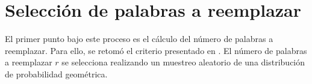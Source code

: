 





 
%



\section{Selección de palabras a reemplazar}

El primer punto bajo este proceso es el cálculo del número de palabras a reemplazar. Para ello, se retomó el criterio presentado en \cite{zhang2015character}. El número de palabras a reemplazar $r$ se selecciona realizando un muestreo aleatorio de una distribución de probabilidad geométrica. 

